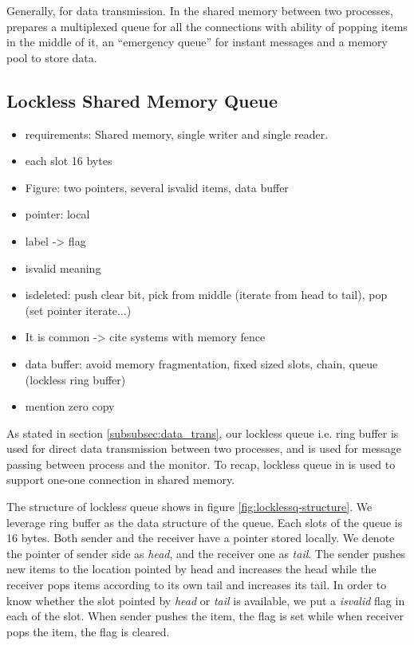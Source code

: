 Generally, for data transmission. In the shared memory between two processes, \libipc prepares a multiplexed queue for all the connections with ability of popping items in the middle of it, an ``emergency queue'' for instant messages and a memory pool to store data.


\subsection{Lockless Shared Memory Queue}
\label{subsec:lockless-queue}


\begin{itemize}
	\item requirements: Shared memory, single writer and single reader.
	\item each slot 16 bytes
	\item Figure: two pointers, several isvalid items, data buffer
	\item pointer: local
	\item label -> flag
	\item isvalid meaning
	\item isdeleted: push clear bit, pick from middle (iterate from head to tail), pop (set pointer iterate...)
	\item It is common -> cite systems with memory fence
	\item data buffer: avoid memory fragmentation, fixed sized slots, chain, queue (lockless ring buffer)
	\item mention zero copy
\end{itemize}

As stated in section \ref{subsubsec:data_trans}, our lockless queue i.e. ring buffer is used for direct data transmission between two processes, and is used for message passing between process and the monitor. To recap, lockless queue in \libipc is used to support one-one connection in shared memory.

The structure of lockless queue shows in figure \ref{fig:locklessq-structure}. We leverage ring buffer as the data structure of the queue. Each slots of the queue is 16 bytes. Both sender and the receiver have a pointer stored locally. We denote the pointer of sender side as \textit{head}, and the receiver one as \textit{tail}. The sender pushes new items to the location pointed by head and increases the head while the receiver pops items according to its own tail and increases its tail.  In order to know whether the slot pointed by \textit{head} or \textit{tail} is available, we put a \textit{isvalid} flag in each of the slot. When sender pushes the item, the flag is set while when receiver pops the item, the flag is cleared.

